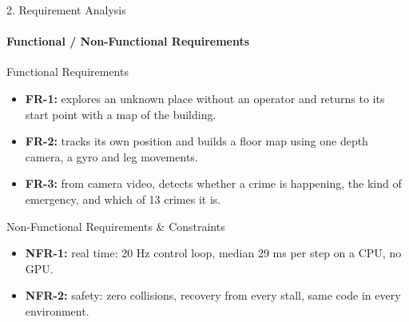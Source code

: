 \documentclass[aspectratio=169, 11pt]{beamer}
\begin{document}
\begin{frame}{2. Requirement Analysis}
    \framesubtitle{Functional / Non-Functional Requirements}
    \begin{block}{Functional Requirements}
        \small
        \begin{itemize}
            \item \textbf{FR-1:} explores an unknown place without an operator and returns to its start point with a map of the building.
            \item \textbf{FR-2:} tracks its own position and builds a floor map using one depth camera, a gyro and leg movements.
            \item \textbf{FR-3:} from camera video, detects whether a crime is happening, the kind of emergency, and which of 13 crimes it is.
        \end{itemize}
    \end{block}

    \begin{block}{Non-Functional Requirements \& Constraints}
        \small
        \begin{itemize}
            \item \textbf{NFR-1:} real time: 20 Hz control loop, median 29 ms per step on a CPU, no GPU.
            \item \textbf{NFR-2:} safety: zero collisions, recovery from every stall, same code in every environment.
        \end{itemize}
    \end{block}
\end{frame}
\end{document}
